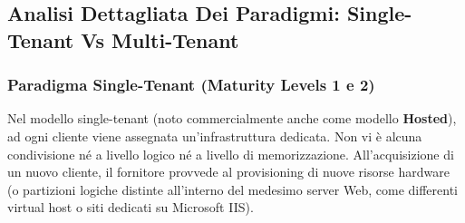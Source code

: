 \documentclass[11pt, a4paper]{article}
\begin{document}
\subsection{Analisi Dettagliata Dei Paradigmi: Single-Tenant Vs Multi-Tenant}

\subsubsection{Paradigma Single-Tenant (Maturity Levels 1 e 2)}
Nel modello single-tenant (noto commercialmente anche come modello \textbf{Hosted}), ad ogni cliente viene assegnata un'infrastruttura dedicata. Non vi è alcuna condivisione né a livello logico né a livello di memorizzazione. All'acquisizione di un nuovo cliente, il fornitore provvede al provisioning di nuove risorse hardware (o partizioni logiche distinte all'interno del medesimo server Web, come differenti virtual host o siti dedicati su Microsoft IIS).
\end{document}
